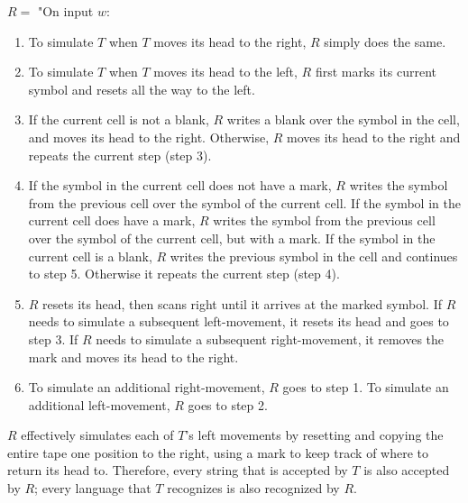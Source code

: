 \documentclass{article}
\begin{document}
  \noindent $R =$ "On input $w$:
  \begin{enumerate} [\indent 1.]
  
  	\item To simulate $T$ when $T$ moves its head to the right, $R$ simply does the same.
  	\item To simulate $T$ when $T$ moves its head to the left, $R$ first marks its current symbol and resets all the way to the left.
  	\item If the current cell is not a blank, $R$ writes a blank over the symbol in the cell, and moves its head to the right. Otherwise, $R$ moves its head to the right and repeats the current step (step 3).
  	\item If the symbol in the current cell does not have a mark, $R$ writes the symbol from the previous cell over the symbol of the current cell. If the symbol in the current cell does have a mark, $R$ writes the symbol from the previous cell over the symbol of the current cell, but with a mark. If the symbol in the current cell is a blank, $R$ writes the previous symbol in the cell and continues to step 5. Otherwise it repeats the current step (step 4).
  	\item $R$ resets its head, then scans right until it arrives at the marked symbol. If $R$ needs to simulate a subsequent left-movement, it resets its head and goes to step 3. If $R$ needs to simulate a subsequent right-movement, it removes the mark and moves its head to the right.
  	\item To simulate an additional right-movement, $R$ goes to step 1. To simulate an additional left-movement, $R$ goes to step 2. \newline
    \end{enumerate}
    
\noindent $R$ effectively simulates each of $T$'s left movements by resetting and copying the entire tape one position to the right, using a mark to keep track of where to return its head to. Therefore, every string that is accepted by $T$ is also accepted by $R$; every language that $T$ recognizes is also recognized by $R$.\newline
\end{document}
